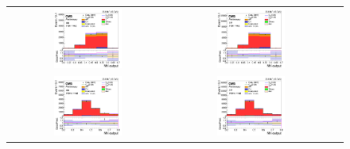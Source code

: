 \begin{figure}[ht]
  \begin{center}
    \begin{tabular}{ccc}
      \includegraphics[width=0.45\textwidth]{figures/tW/fig/Result/ee/H_MLP_1jet_1bjet.png} &
      \includegraphics[width=0.45\textwidth]{figures/tW/fig/Result/mumu/H_MLP_1jet_1bjet.png}\\
      \includegraphics[width=0.45\textwidth]{figures/tW/fig/Result/ee/H_MLP_2jet_1bjet.png} &
      \includegraphics[width=0.45\textwidth]{figures/tW/fig/Result/mumu/H_MLP_2jet_1bjet.png}\\

\end{tabular}
\end{center}
\end{figure}
